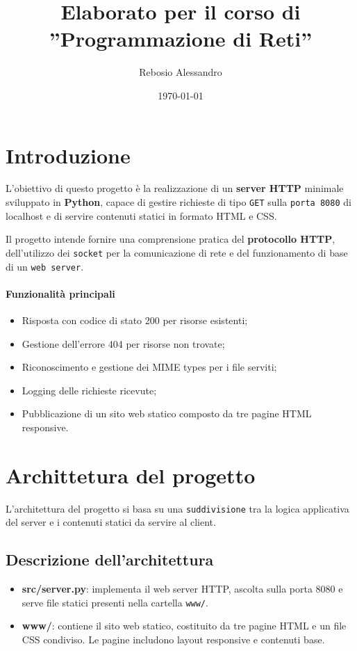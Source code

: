 \documentclass[a4paper,12pt]{report}
\title{Elaborato per il corso di\\''Programmazione di Reti''}
\author{Rebosio Alessandro}
\date{\today}
\begin{document}
\maketitle

\tableofcontents

\chapter{Introduzione}

L'obiettivo di questo progetto è la realizzazione di un \textbf{server HTTP} \newline minimale sviluppato in \textbf{Python},
capace di gestire richieste di tipo \texttt{GET} sulla \texttt{porta 8080} di localhost e di servire contenuti statici
in formato HTML e CSS.

\vspace{0.5cm}

\noindent Il progetto intende fornire una comprensione pratica del \textbf{protocollo \newline HTTP}, dell'utilizzo dei \texttt{socket}
per la comunicazione di rete e del funzionamento di base di un \texttt{web server}.

\subsubsection{Funzionalità principali}
\begin{itemize}
    \item Risposta con codice di stato 200 per risorse esistenti;
    \item Gestione dell'errore 404 per risorse non trovate;
    \item Riconoscimento e gestione dei MIME types per i file serviti;
    \item Logging delle richieste ricevute;
    \item Pubblicazione di un sito web statico composto da tre pagine HTML responsive.
\end{itemize}


\chapter{Archittetura del progetto}
L'architettura del progetto si basa su una \texttt{suddivisione} tra la logica \newline applicativa del server e i
contenuti statici da servire al client.

\section{Descrizione dell'architettura}
\begin{itemize}
    \item \textbf{src/server.py}: implementa il web server HTTP, ascolta sulla porta 8080 e serve file
          statici presenti nella cartella \texttt{www/}.
    \item \textbf{www/}: contiene il sito web statico, costituito da tre pagine HTML e un file CSS
          condiviso. Le pagine includono layout responsive e contenuti base.
\end{itemize}
\end{document}
